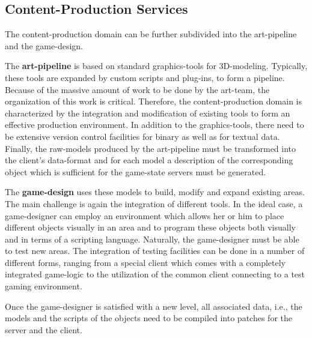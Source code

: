 \documentclass[a4paper, 10pt]{book}
\begin{document}
                \subsection{Content-Production Services}
                \label{sec:cont-prod-serv}

                The content-production domain can be further subdivided into the
                art-pipeline and the game-design.
                \begin{description}
                    \item The \textbf{art-pipeline} is based on standard graphics-tools
                        for 3D-modeling.  Typically, these tools are expanded by custom
                        scripts and plug-ins, to form a pipeline. Because of the massive
                        amount of work to be done by the art-team, the organization of this
                        work is critical. Therefore, the content-production domain is
                        characterized by the integration and modification of existing tools
                        to form an effective production environment. In addition to the
                        graphics-tools, there need to be extensive version control
                        facilities for binary as well as for textual data. Finally, the
                        raw-models produced by the art-pipeline must be transformed into the
                        client's data-format and for each model a description of the
                        corresponding object which is sufficient for the game-state servers
                        must be generated.
                    \item The \textbf{game-design} uses these models to build, modify and
                        expand existing areas. The main challenge is again the integration
                        of different tools. In the ideal case, a game-designer can employ an
                        environment which allows her or him to place different objects
                        visually in an area and to program these objects both visually and
                        in terms of a scripting language.
                        Naturally, the game-designer must be able to test new areas. The
                        integration of testing facilities can be done in a number of
                        different forms, ranging from a special client which comes with a
                        completely integrated game-logic to the utilization of the common
                        client connecting to a test gaming environment.
                \end{description}
                Once the game-designer is satisfied with a new level, all associated
                data, i.e., the models and the scripts of the objects need to be compiled
                into patches for the server and the client. 
\end{document}
